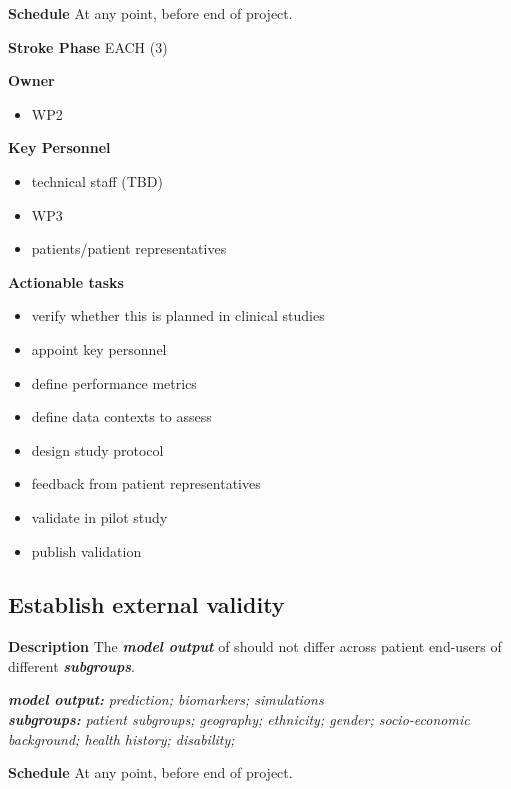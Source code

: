 \documentclass[
  letterpaper,
  DIV=11,
  numbers=noendperiod]{scrreport}
\providecommand{\tightlist}{%
  \setlength{\itemsep}{0pt}\setlength{\parskip}{0pt}}\usepackage{longtable,booktabs,array}
\begin{document}
\textbf{Schedule} At any point, before end of project.

\textbf{Stroke Phase} EACH (3)

\textbf{Owner}

\begin{itemize}
\tightlist
\item
  WP2
\end{itemize}

\textbf{Key Personnel}

\begin{itemize}
\tightlist
\item
  technical staff (TBD)
\item
  WP3
\item
  patients/patient representatives
\end{itemize}

\textbf{Actionable tasks}

\begin{itemize}
\tightlist
\item
  verify whether this is planned in clinical studies
\item
  appoint key personnel
\item
  define performance metrics
\item
  define data contexts to assess
\item
  design study protocol
\item
  feedback from patient representatives
\item
  validate in pilot study
\item
  publish validation
\end{itemize}

\hypertarget{establish-external-validity}{%
\subsection{Establish external
validity}\label{establish-external-validity}}

\textbf{Description} The \textbf{\emph{model output}} of should not
differ across patient end-users of different \textbf{\emph{subgroups}}.

\textbf{\emph{model output:}} \emph{prediction; biomarkers;
simulations}\\
\textbf{\emph{subgroups:}} \emph{patient subgroups; geography;
ethnicity; gender; socio-economic background; health history;
disability;}

\textbf{Schedule} At any point, before end of project.
\end{document}
